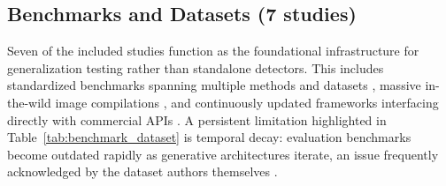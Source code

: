 \documentclass[sn-mathphys-num,Numbered,pdflatex]{sn-jnl}
\begin{document}
\subsection{Benchmarks and Datasets (7 studies)}
Seven of the included studies function as the foundational infrastructure for generalization testing rather than standalone detectors. This includes standardized benchmarks spanning multiple methods and datasets \cite{DeepfakebenchA4}, massive in-the-wild image compilations \cite{TowardsRealworld56,WildfakeA66}, and continuously updated frameworks interfacing directly with commercial APIs \cite{AigenbenchA72}. A persistent limitation highlighted in Table~\ref{tab:benchmark_dataset} is temporal decay: evaluation benchmarks become outdated rapidly as generative architectures iterate, an issue frequently acknowledged by the dataset authors themselves \cite{TowardsRealworld56,Deepfakeeval2024A64}.
\end{document}
